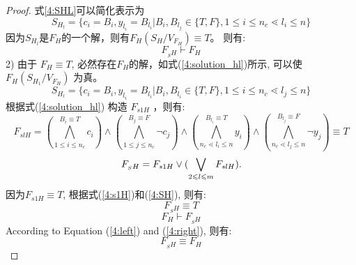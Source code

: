 \begin{proof}
式\ref{4:SHL}可以简化表示为
\begin{equation}
S_{H_l}=\{c_i=B_i, y_{l_i}=B_{l_i}|B_i,B_{l_j} \in \{T,F\}, 1\leqslant i\leqslant n_c \lessdot l_i\leqslant n\}
\end{equation}
因为$S_{H_l}$是$F_H$的一个解，则有$F_H(S_H/V_{F_H})\equiv T$。 则有:
\begin{equation}\label{4:left}
 F_{_SH} \vdash F_H
\end{equation}
2) 由于 $F_H\equiv T$, 必然存在$F_H$的解，如式(\ref{4:solution_hl})所示, 可以使$F_H(S_{H_1}/V_{F_H})$ 为真。
\begin{equation}\label{4:solution_hl}
S_{H_l}=\{c_i=B_i, y_{l_i}=B_{l_i}|B_i,B_{l_i} \in \{T,F\}, 1\leqslant i\leqslant n_c \lessdot l_j\leqslant n\}
\end{equation}
根据式(\ref{4:solution_hl}) 构造 $F_{s1H}$ ，则有:
\begin{equation}\label{4:s1H}
F_{slH}=
(\bigwedge_{1\leqslant i\leqslant n_c}^{B_i\equiv T} c_i)\wedge
(\bigwedge_{1\leqslant j\leqslant n_c}^{B_j\equiv F}\neg c_j)\wedge
(\bigwedge_{n_c\lessdot l_i\leqslant n}^{B_{l_i}\equiv T} y_i)\wedge
(\bigwedge_{n_c\lessdot l_j\leqslant n}^{B_{l_j}\equiv F}\neg y_j)
 \equiv T
\end{equation}
\begin{equation}\label{4:SH}
F_{_SH} =F_ {s1H} \vee (\bigvee_{2\leqslant l\leqslant m}F_{slH}). \\
\end{equation}
因为$F_{s1H} \equiv T$, 根据式(\ref{4:s1H})和(\ref{4:SH}), 则有:
\begin{equation}
F_{_SH} \equiv T
\end{equation}
\begin{equation}\label{4:right}
F_H \vdash F_{_SH}
\end{equation}
According to Equation (\ref{4:left}) and (\ref{4:right}), 则有:
\begin{equation}
 F_{_SH} \equiv F_H
\end{equation}
\end{proof}

